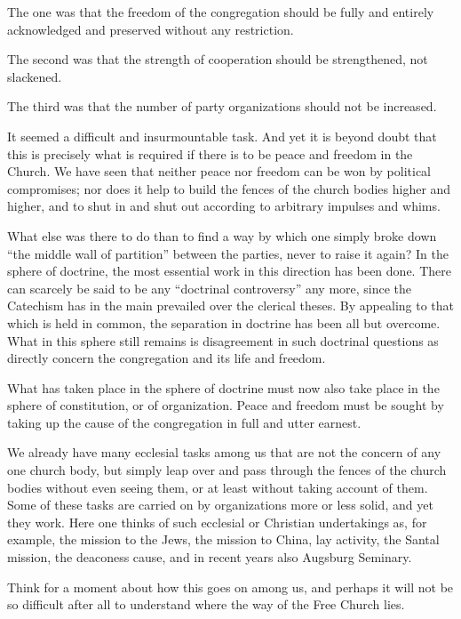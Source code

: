 The one was that the freedom of the congregation should be fully and entirely acknowledged and preserved without any restriction.

The second was that the strength of cooperation should be strengthened, not slackened.

The third was that the number of party organizations should not be increased.

It seemed a difficult and insurmountable task. And yet it is beyond doubt that this is precisely what is required if there is to be peace and freedom in the Church. We have seen that neither peace nor freedom can be won by political compromises; nor does it help to build the fences of the church bodies higher and higher, and to shut in and shut out according to arbitrary impulses and whims.

What else was there to do than to find a way by which one simply broke down “the middle wall of partition” between the parties, never to raise it again? In the sphere of doctrine, the most essential work in this direction has been done. There can scarcely be said to be any “doctrinal controversy” any more, since the Catechism has in the main prevailed over the clerical theses. By appealing to that which is held in common, the separation in doctrine has been all but overcome. What in this sphere still remains is disagreement in such doctrinal questions as directly concern the congregation and its life and freedom.

What has taken place in the sphere of doctrine must now also take place in the sphere of constitution, or of organization. Peace and freedom must be sought by taking up the cause of the congregation in full and utter earnest.

We already have many ecclesial tasks among us that are not the concern of any one church body, but simply leap over and pass through the fences of the church bodies without even seeing them, or at least without taking account of them. Some of these tasks are carried on by organizations more or less solid, and yet they work. Here one thinks of such ecclesial or Christian undertakings as, for example, the mission to the Jews, the mission to China, lay activity, the Santal mission, the deaconess cause, and in recent years also Augsburg Seminary.

Think for a moment about how this goes on among us, and perhaps it will not be so difficult after all to understand where the way of the Free Church lies.


